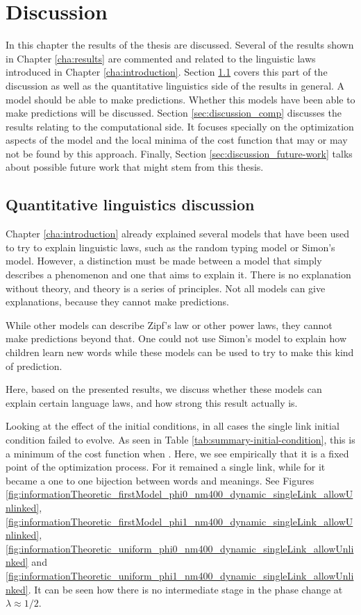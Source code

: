 \chapter{Discussion}
\label{cha:discussion}

In this chapter the results of the thesis are discussed.
Several of the results shown in Chapter \ref{cha:results} are commented and related to the linguistic laws introduced in Chapter \ref{cha:introduction}.
Section \ref{sec:discussion_math} covers this part of the discussion as well as the quantitative linguistics side of the results in general.
A model should be able to make predictions.
Whether this models have been able to make predictions will be discussed.
Section \ref{sec:discussion_comp} discusses the results relating to the computational side.
It focuses specially on the optimization aspects of the model and the local minima of the cost function that may or may not be found by this approach.
Finally, Section \ref{sec:discussion_future-work} talks about possible future work that might stem from this thesis.

\section{Quantitative linguistics discussion}
\label{sec:discussion_math}

Chapter \ref{cha:introduction} already explained several models that have been used to try to explain linguistic laws, such as the random typing model or Simon's model.
However, a distinction must be made between a model that simply describes a phenomenon and one that aims to explain it.
There is no explanation without theory, and theory is a series of principles.
Not all models can give explanations, because they cannot make predictions.

While other models can describe Zipf's law or other power laws, they cannot make predictions beyond that.
One could not use Simon's model to explain how children learn new words while these models can be used to try to make this kind of prediction. \cite{Ferrer2017a} \cite{Carrera2021a}

Here, based on the presented results, we discuss whether these models can explain certain language laws, and how strong this result actually is.

Looking at the effect of the initial conditions, in all cases the single link initial condition failed to evolve.
As seen in Table \ref{tab:summary-initial-condition}, this is a minimum of the cost function when \lambdaZeroToHalf{}.
Here, we see empirically that it is a fixed point of the optimization process.
For \lambdaZeroToHalf{} it remained a single link, while for \lambdaHalfToOne{} it became a one to one bijection between words and meanings. See Figures \ref{fig:informationTheoretic_firstModel_phi0_nm400_dynamic_singleLink_allowUnlinked}, \ref{fig:informationTheoretic_firstModel_phi1_nm400_dynamic_singleLink_allowUnlinked}, \ref{fig:informationTheoretic_uniform_phi0_nm400_dynamic_singleLink_allowUnlinked} and \ref{fig:informationTheoretic_uniform_phi1_nm400_dynamic_singleLink_allowUnlinked}. It can be seen how there is no intermediate stage in the phase change at $\lambda \approx 1/2$.


